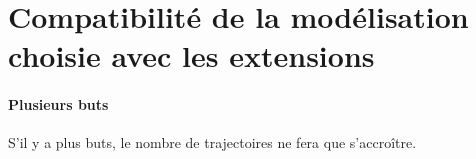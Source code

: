 \documentclass{article}
\begin{document}





\section{Compatibilité de la modélisation choisie avec les extensions}
\paragraph{Plusieurs buts}
S'il y a plus buts, le nombre de trajectoires ne fera que s'accroître.
\end{document}
